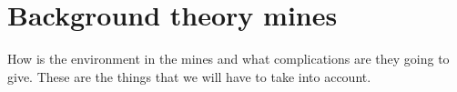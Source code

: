 \chapter{Background theory mines}
How is the environment in the mines and what complications are they going to give. These are the things that we will have to take into account.
